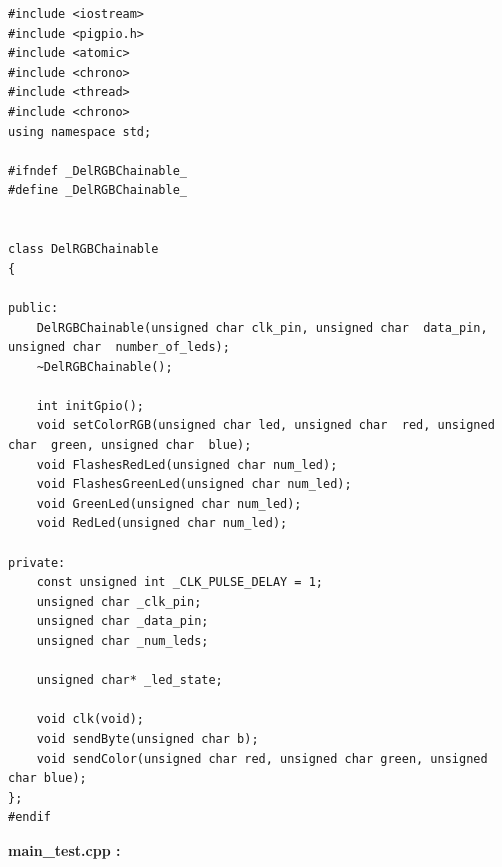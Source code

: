 \documentclass[main.tex]{subfiles}
\begin{document}
\begin{lstlisting}
#include <iostream>
#include <pigpio.h>
#include <atomic>
#include <chrono>
#include <thread>
#include <chrono>
using namespace std;

#ifndef _DelRGBChainable_
#define _DelRGBChainable_


class DelRGBChainable
{

public:
    DelRGBChainable(unsigned char clk_pin, unsigned char  data_pin, unsigned char  number_of_leds);
    ~DelRGBChainable();

    int initGpio();
    void setColorRGB(unsigned char led, unsigned char  red, unsigned char  green, unsigned char  blue);
    void FlashesRedLed(unsigned char num_led);
    void FlashesGreenLed(unsigned char num_led);
    void GreenLed(unsigned char num_led);
    void RedLed(unsigned char num_led);

private:
    const unsigned int _CLK_PULSE_DELAY = 1;
    unsigned char _clk_pin;
    unsigned char _data_pin;
    unsigned char _num_leds;

    unsigned char* _led_state;

    void clk(void);
    void sendByte(unsigned char b);
    void sendColor(unsigned char red, unsigned char green, unsigned char blue);
};
#endif
\end{lstlisting}

\textbf{main\_test.cpp :}
\end{document}
